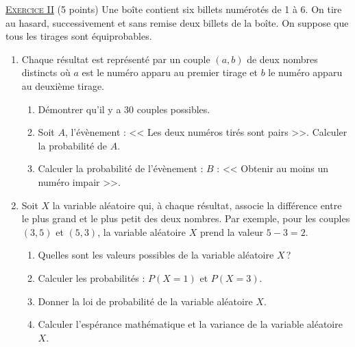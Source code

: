 \noindent \underline{\textsc{Exercice II}} (5 points) \newline
      Une bo\^ite contient six billets num\'erot\'es de 1 \`a 6.
      On tire au hasard, successivement et sans remise deux billets de la bo\^ite.
      On suppose que tous les tirages sont \'equiprobables.
      \begin{enumerate}
            \item Chaque r\'esultat est repr\'esent\'e par un couple $(a,b)$ de deux nombres distincts o\`u 
                  $a$ est le num\'ero apparu au premier tirage et $b$ le num\'ero apparu au deuxi\`eme tirage.
                  \begin{enumerate}
                        \item D\'emontrer qu'il y a 30 couples possibles.
                        \item Soit $A$, l'\'ev\`enement : << Les deux num\'eros tir\'es sont pairs >>.
                              Calculer la probabilit\'e de $A$.
                        \item Calculer la probabilit\'e de l'\'ev\`enement : 
                              $B$ : << Obtenir au moins un num\'ero impair >>.
                  \end{enumerate}
            \item Soit $X$ la variable al\'eatoire qui, \`a chaque r\'esultat, associe la diff\'erence entre le plus grand
                  et le plus petit des deux nombres.
                  Par exemple, pour les couples $(3,5)$ et $(5,3)$, la variable al\'eatoire $X$ prend la valeur $5 - 3 = 2$.
                  \begin{enumerate}
                        \item Quelles sont les valeurs possibles de la variable al\'eatoire $X$\,?
                        \item Calculer les probabilit\'es : $P(X = 1)$ et $P(X = 3)$.
                        \item Donner la loi de probabilit\'e de la variable al\'eatoire $X$.
                        \item Calculer l'esp\'erance math\'ematique et la variance de la variable al\'eatoire $X$.
                  \end{enumerate}
      \end{enumerate}

